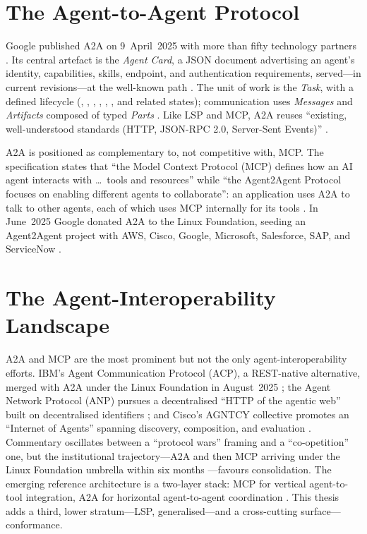 \section{The Agent-to-Agent Protocol}
\label{sec:bg-a2a}

Google published A2A on 9~April~2025 with more than fifty technology partners
\citep{a2a-google-2025}. Its central artefact is the \emph{Agent Card}, a JSON
document advertising an agent's identity, capabilities, skills, endpoint, and
authentication requirements, served---in current revisions---at the well-known
path  \citep{a2a-spec,a2a-discovery}. The unit
of work is the \emph{Task}, with a defined lifecycle (,
, , , ,
, and related states); communication uses \emph{Messages} and
\emph{Artifacts} composed of typed \emph{Parts} \citep{a2a-spec}. Like LSP and
MCP, A2A reuses ``existing, well-understood standards (HTTP, JSON-RPC 2.0,
Server-Sent Events)'' \citep{a2a-spec}.

A2A is positioned as complementary to, not competitive with, MCP. The
specification states that ``the Model Context Protocol (MCP) defines how an AI
agent interacts with \dots\ tools and resources'' while ``the Agent2Agent
Protocol focuses on enabling different agents to collaborate'': an application
uses A2A to talk to other agents, each of which uses MCP internally for its tools
\citep{a2a-mcp}. In June~2025 Google donated A2A to the Linux Foundation, seeding
an Agent2Agent project with AWS, Cisco, Google, Microsoft, Salesforce, SAP, and
ServiceNow \citep{a2a-lf-donation,lf-a2a-press}.

\section{The Agent-Interoperability Landscape}
\label{sec:bg-landscape}

A2A and MCP are the most prominent but not the only agent-interoperability
efforts. IBM's Agent Communication Protocol (ACP), a REST-native alternative,
merged with A2A under the Linux Foundation in August~2025 \citep{acp-a2a-merge};
the Agent Network Protocol (ANP) pursues a decentralised ``HTTP of the agentic
web'' built on decentralised identifiers \citep{anp-github}; and Cisco's AGNTCY
collective promotes an ``Internet of Agents'' spanning discovery, composition,
and evaluation \citep{agntcy-cisco}. Commentary oscillates between a ``protocol
wars'' framing and a ``co-opetition'' one, but the institutional trajectory---A2A
and then MCP arriving under the Linux Foundation umbrella within six months
\citep{lf-a2a-press,lf-aaif-press}---favours consolidation. The emerging
reference architecture is a two-layer stack: MCP for vertical agent-to-tool
integration, A2A for horizontal agent-to-agent coordination
\citep{a2a-google-2025,a2a-mcp}. This thesis adds a third, lower stratum---LSP,
generalised---and a cross-cutting surface---conformance.

